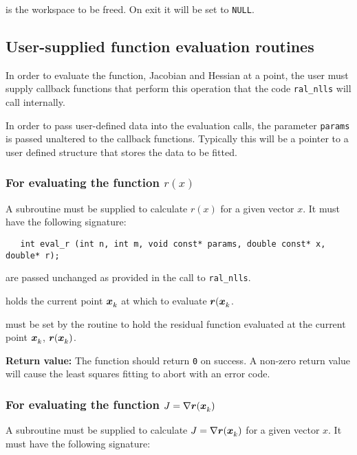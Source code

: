 \documentclass{spec}
\begin{document}
\begin{description}
    is the workspace to be freed. On exit it will be set to \texttt{NULL}.
\end{description}


\subsection{User-supplied function evaluation routines}
\label{sec::function_eval}
In order to evaluate the function, Jacobian and Hessian at a point, the user
must supply callback functions that perform this operation that the code
{\tt ral\_nlls} will call internally.

In order to pass user-defined data into the evaluation calls, the parameter
\texttt{params} is passed unaltered to the callback functions. Typically this
will be a pointer to a user defined structure that stores the data to be fitted.

\subsubsection{For evaluating the function $r(x)$}
A subroutine must be supplied to calculate $r(x)$ for a given vector $x$. It
must have the following signature:

\begin{verbatim}
   int eval_r (int n, int m, void const* params, double const* x, double* r);
\end{verbatim}

\begin{description}
    are passed unchanged as provided in the call to
      {\tt ral\_nlls}.

    holds the current point ${\bm x}_{k}^{}$ at which to evaluate ${\bm r}({\bm x}_{k}^{}$.

    must be set by the routine to hold the residual function
      evaluated at the current point ${\bm x}_{k}^{}$, ${\bm r}({\bm x}_{k}^{})$.
\end{description}
\textbf{Return value:} The function should return \texttt{0} on success. A
non-zero return value will cause the least squares fitting to abort with an
error code.


\subsubsection{For evaluating the function $J = \nabla {\bm r}({\bm x}_{k}^{})$}
A subroutine must be supplied to calculate $J = \nabla {\bm r}({\bm x}_{k}^{})$ for a given vector $x$. It must have the following signature:
\end{document}
